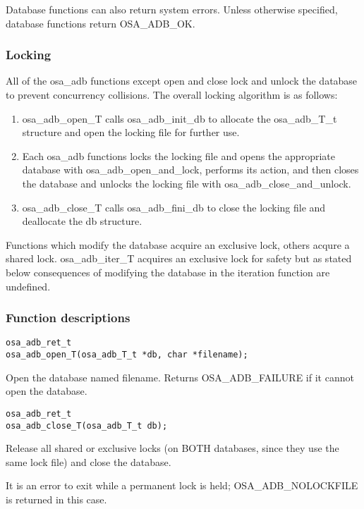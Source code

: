Database functions can also return system errors.  Unless otherwise
specified, database functions return OSA_ADB_OK.

\subsubsection{Locking}

All of the osa_adb functions except open and close lock and unlock the
database to prevent concurrency collisions.  The overall locking
algorithm is as follows:

\begin{enumerate}
\item osa_adb_open_T calls osa_adb_init_db to allocate the osa_adb_T_t
structure and open the locking file for further use.

\item Each osa_adb functions locks the locking file and opens the
appropriate database with osa_adb_open_and_lock, performs its action,
and then closes the database and unlocks the locking file with
osa_adb_close_and_unlock.

\item osa_adb_close_T calls osa_adb_fini_db to close the locking file
and deallocate the db structure.
\end{enumerate}

Functions which modify the database acquire an exclusive lock, others
acqure a shared lock.  osa_adb_iter_T acquires an exclusive lock for
safety but as stated below consequences of modifying the database in
the iteration function are undefined.

\subsubsection{Function descriptions}

\begin{verbatim}
osa_adb_ret_t
osa_adb_open_T(osa_adb_T_t *db, char *filename);
\end{verbatim}
%
Open the database named filename.  Returns OSA_ADB_FAILURE if it
cannot open the database.

\begin{verbatim}
osa_adb_ret_t
osa_adb_close_T(osa_adb_T_t db);
\end{verbatim}
%
Release all shared or exclusive locks (on BOTH databases, since they
use the same lock file) and close the database.

It is an error to exit while a permanent lock is held;
OSA_ADB_NOLOCKFILE is returned in this case.

